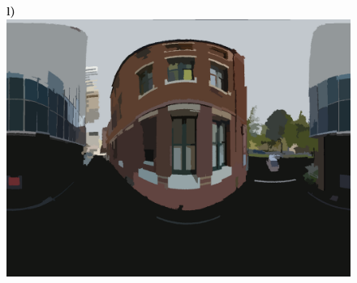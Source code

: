 \documentclass[final,3p,times,authoryear]{elsarticle}
\begin{document}
\begin{figure}
\textbf{l)}\includegraphics[scale=0.08]{Images/mean/0070_7_8_300.png} 


\end{figure}
\end{document}

